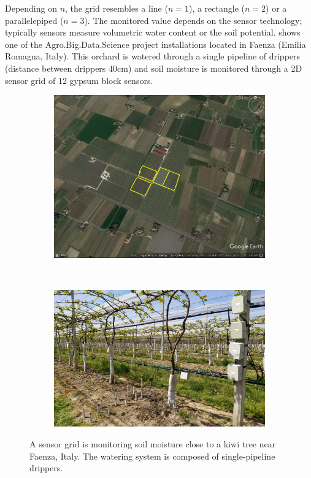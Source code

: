 Depending on $n$, the grid resembles a line ($n=1$), a rectangle ($n=2$) or a parallelepiped ($n=3$). The monitored value depends on the sensor technology; typically sensors measure volumetric water content or the soil potential.  shows one of the Agro.Big.Data.Science project installations \cite{ABDS} located in Faenza (Emilia Romagna, Italy).
This orchard is watered through a single pipeline of drippers (distance between drippers 40cm) and soil moisture is monitored through a 2D sensor grid of 12 gypsum block sensors.

\begin{figure}[t]
    \centering
    \begin{subfigure}[t]{.5\textwidth}
    \centering
    \includegraphics[scale=.145]{chapters/physics-aware/pluto/img/sensors-satellite.png}
    \end{subfigure}~
    \begin{subfigure}[t]{.5\textwidth}
    \centering
    \includegraphics[scale=.4]{chapters/physics-aware/pluto/img/sensors.jpg}
    \end{subfigure}
    \caption{A sensor grid is monitoring soil moisture close to a kiwi tree near Faenza, Italy. The watering system is composed of single-pipeline drippers.}
    \label{pluto-fig:installation}
\end{figure}

